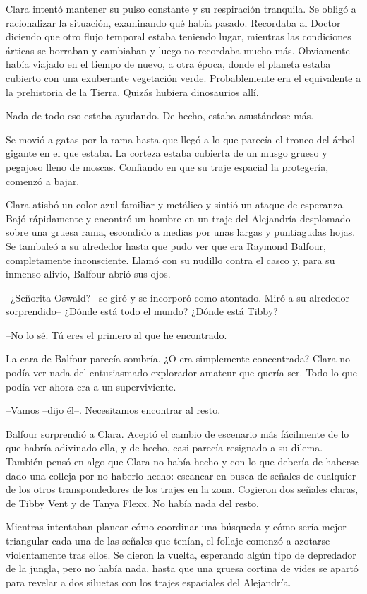 {Clara intentó mantener su pulso constante y su respiración tranquila. Se
 obligó a racionalizar la situación, examinando qué había pasado.
 Recordaba al Doctor diciendo que otro flujo temporal estaba teniendo
 lugar, mientras las condiciones árticas se borraban y cambiaban y luego
 no recordaba mucho más. Obviamente había viajado en el tiempo de nuevo,
 a otra época, donde el planeta estaba cubierto con una exuberante
 vegetación verde. Probablemente era el equivalente a la prehistoria de
la Tierra. Quizás hubiera dinosaurios allí.}

{Nada de todo eso estaba ayudando. De hecho, estaba asustándose más.}

{Se movió a gatas por la rama hasta que llegó a lo que parecía el tronco
 del árbol gigante en el que estaba. La corteza estaba cubierta de un
 musgo grueso y pegajoso lleno de moscas. Confiando en que su traje
 espacial la protegería, comenzó a bajar.}

{Clara atisbó
 un color azul familiar y metálico y sintió un ataque de esperanza. Bajó
 rápidamente y encontró un hombre en un traje del Alejandría desplomado
 sobre una gruesa rama, escondido a medias por unas largas y puntiagudas
 hojas. Se tambaleó a su alrededor hasta que pudo ver que era Raymond
 Balfour, completamente inconsciente. Llamó con su nudillo contra el
casco y, para su inmenso alivio, Balfour abrió sus ojos.}

{--¿Señorita Oswald? --se giró y se incorporó como atontado. Miró a su
alrededor sorprendido-- ¿Dónde está todo el mundo? ¿Dónde está Tibby?}

{--No lo sé. Tú eres el primero al que he encontrado.}

{La cara de Balfour parecía sombría. ¿O era simplemente concentrada?
 Clara no podía ver nada del entusiasmado explorador amateur que quería
ser. Todo lo que podía ver ahora era a un superviviente.}

{--Vamos --dijo él--. Necesitamos encontrar al
 resto.}

{Balfour sorprendió a Clara. Aceptó el cambio de
 escenario más fácilmente de lo que habría adivinado ella, y de hecho,
 casi parecía resignado a su dilema. También pensó en algo que Clara no
 había hecho y con lo que debería de haberse dado una colleja por no
 haberlo hecho: escanear en busca de señales de cualquier de los otros
 transpondedores de los trajes en la zona. Cogieron dos señales claras,
de Tibby Vent y de Tanya Flexx. No había nada del resto.}

{Mientras intentaban planear cómo coordinar una búsqueda y cómo sería
 mejor triangular cada una de las señales que tenían, el follaje comenzó
 a azotarse violentamente tras ellos. Se dieron la vuelta, esperando
 algún tipo de depredador de la jungla, pero no había nada, hasta que una
 gruesa cortina de vides se apartó para revelar a dos siluetas con los
trajes espaciales del Alejandría.}


